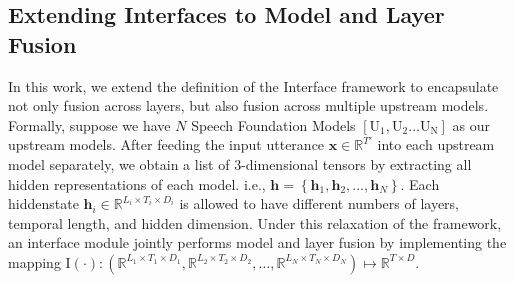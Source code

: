\subsection{Extending Interfaces to Model and Layer Fusion}
In this work, we extend the definition of the Interface framework to encapsulate not only fusion across layers, but also fusion across multiple upstream models.
Formally, suppose we have $N$ Speech Foundation Models $\left[\mathrm{U_1},\mathrm{U_2}\dots \mathrm{U_N}\right]$ as our upstream models.
After feeding the input utterance $\mathbf{x}\in \mathbb{R}^{T'}$ into each upstream model separately, we obtain a list of 3-dimensional tensors by extracting all hidden representations of each model. i.e., $\mathbf{h}=\left\{\mathbf{h}_1,\mathbf{h}_2,\dots,\mathbf{h}_N\right\}$.
Each hiddenstate $\mathbf{h}_i\in \mathbb{R}^{ L_i \times T_i \times D_i}$ is allowed to have different numbers of layers, temporal length, and hidden dimension. 
Under this relaxation of the framework, an interface module jointly performs model and layer fusion by implementing the mapping $\mathrm{I}\left(\cdot \right): \left( 
\mathbb{R}^{L_1\times T_1\times D_1},
\mathbb{R}^{L_2\times T_2\times D_2},
\dots,
\mathbb{R}^{L_N\times T_N\times D_N}
\right) \mapsto \mathbb{R}^{ T\times D}$.





